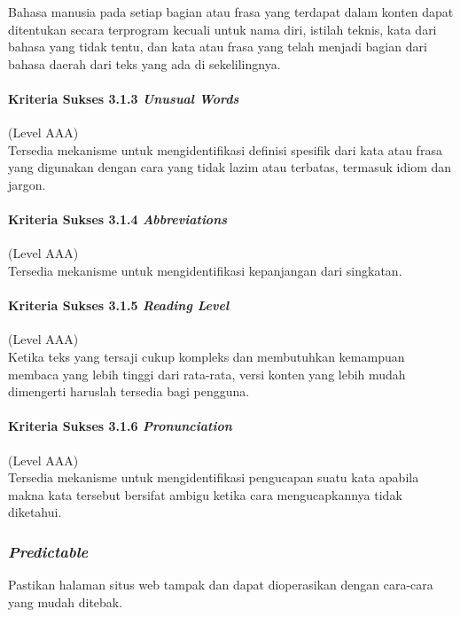 Bahasa manusia pada setiap bagian atau frasa yang terdapat dalam konten dapat ditentukan secara terprogram kecuali untuk nama diri, istilah teknis, kata dari bahasa yang tidak tentu, dan kata atau frasa yang telah menjadi bagian dari bahasa daerah dari teks yang ada di sekelilingnya.

\paragraph{Kriteria Sukses 3.1.3 \textit{Unusual Words}}
\label{sec:kriteria_sukses_3.1.3}
(Level AAA)\\

Tersedia mekanisme untuk mengidentifikasi definisi spesifik dari kata atau frasa yang digunakan dengan cara yang tidak lazim atau terbatas, termasuk idiom dan jargon.

\paragraph{Kriteria Sukses 3.1.4 \textit{Abbreviations}}
\label{sec:kriteria_sukses_3.1.4}
(Level AAA)\\

Tersedia mekanisme untuk mengidentifikasi kepanjangan dari singkatan.

\paragraph{Kriteria Sukses 3.1.5 \textit{Reading Level}}
\label{sec:kriteria_sukses_3.1.5}
(Level AAA)\\

Ketika teks yang tersaji cukup kompleks dan membutuhkan kemampuan membaca yang lebih tinggi dari rata-rata, versi konten yang lebih mudah dimengerti haruslah tersedia bagi pengguna.

\paragraph{Kriteria Sukses 3.1.6 \textit{Pronunciation}}
\label{sec:kriteria_sukses_3.1.6}
(Level AAA)\\

Tersedia mekanisme untuk mengidentifikasi pengucapan suatu kata apabila makna kata tersebut bersifat ambigu ketika cara mengucapkannya tidak diketahui.

\subsubsection{\textit{Predictable}}
\label{sec:predictable}
Pastikan halaman situs web tampak dan dapat dioperasikan dengan cara-cara yang mudah ditebak.

